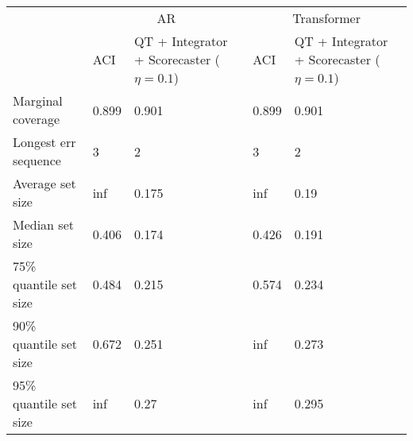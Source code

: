 \begin{tabular}{lllll}
\toprule
& \multicolumn{2}{c}{AR}& \multicolumn{2}{c}{Transformer} \\
& ACI & QT + Integrator + Scorecaster ($\eta=0.1$) & ACI & QT + Integrator + Scorecaster ($\eta=0.1$) \\
\midrule
Marginal coverage & 0.899 & 0.901 & 0.899 & 0.901 \\
Longest err sequence & 3 & 2 & 3 & 2 \\
Average set size & inf & 0.175 & inf & 0.19 \\
Median set size & 0.406 & 0.174 & 0.426 & 0.191 \\
75\% quantile set size & 0.484 & 0.215 & 0.574 & 0.234 \\
90\% quantile set size & 0.672 & 0.251 & inf & 0.273 \\
95\% quantile set size & inf & 0.27 & inf & 0.295 \\
\bottomrule
\end{tabular}
